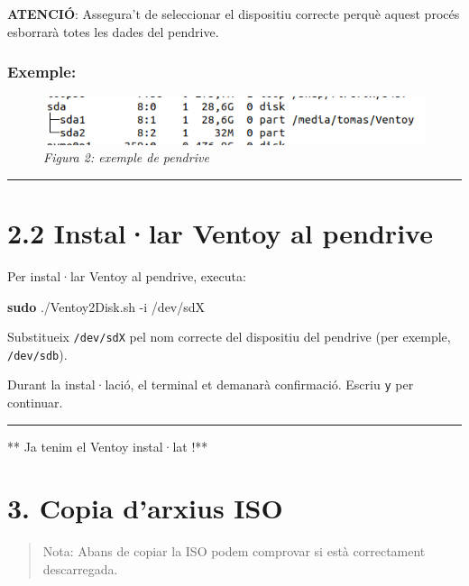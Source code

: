 \documentclass[
  a4paper,
]{article}
\newenvironment{Shaded}{\begin{snugshade}}{\end{snugshade}}
\newcommand{\AttributeTok}[1]{\textcolor[rgb]{0.13,0.29,0.53}{#1}}
\newcommand{\FunctionTok}[1]{\textcolor[rgb]{0.13,0.29,0.53}{\textbf{#1}}}
\newcommand{\NormalTok}[1]{#1}
\begin{document}
\textbf{ATENCIÓ}: Assegura't de seleccionar el dispositiu correcte
perquè aquest procés esborrarà totes les dades del pendrive.

\subsubsection{Exemple:}\label{exemple}

\begin{figure}
\centering
\includegraphics{png/sda.png}
\caption{\emph{Figura 2: exemple de pendrive}}
\end{figure}

\begin{center}\rule{0.5\linewidth}{0.5pt}\end{center}

\section{2.2 Instal·lar Ventoy al
pendrive}\label{installar-ventoy-al-pendrive}

Per instal·lar Ventoy al pendrive, executa:

\begin{Shaded}
\begin{Highlighting}[]
\FunctionTok{sudo}\NormalTok{ ./Ventoy2Disk.sh }\AttributeTok{{-}i}\NormalTok{ /dev/sdX}
\end{Highlighting}
\end{Shaded}

Substitueix \texttt{/dev/sdX} pel nom correcte del dispositiu del
pendrive (per exemple, \texttt{/dev/sdb}).

Durant la instal·lació, el terminal et demanarà confirmació. Escriu
\texttt{y} per continuar.

\begin{center}\rule{0.5\linewidth}{0.5pt}\end{center}

** Ja tenim el Ventoy instal·lat !**

\section{3. Copia d'arxius ISO}\label{copia-darxius-iso}

\begin{quote}
Nota: Abans de copiar la ISO podem comprovar si està correctament
descarregada.
\end{quote}
\end{document}
